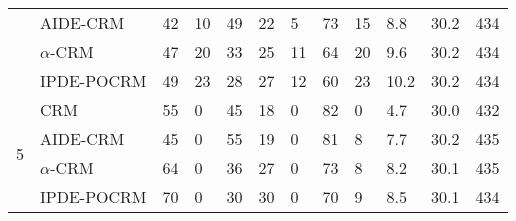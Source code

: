 \begin{tabular*}{\textwidth}{@{\extracolsep\fill}clllllllllll@{\extracolsep\fill}}
 & AIDE-CRM & 42 & 10 & 49 & 22 & 5 & 73 & 15 & 8.8 & 30.2 & 434\\
 & $\alpha$-CRM & 47 & 20 & 33 & 25 & 11 & 64 & 20 & 9.6 & 30.2 & 434\\
 & IPDE-POCRM & 49 & 23 & 28 & 27 & 12 & 60 & 23 & 10.2 & 30.2 & 434\\
\midrule
\multirow{4}{2em}{5} & CRM & 55 & 0 & 45 & 18 & 0 & 82 & 0 & 4.7 & 30.0 & 432\\
 & AIDE-CRM & 45 & 0 & 55 & 19 & 0 & 81 & 8 & 7.7 & 30.2 & 435\\
 & $\alpha$-CRM & 64 & 0 & 36 & 27 & 0 & 73 & 8 & 8.2 & 30.1 & 435\\
 & IPDE-POCRM & 70 & 0 & 30 & 30 & 0 & 70 & 9 & 8.5 & 30.1 & 434\\
\bottomrule
\end{tabular*}
